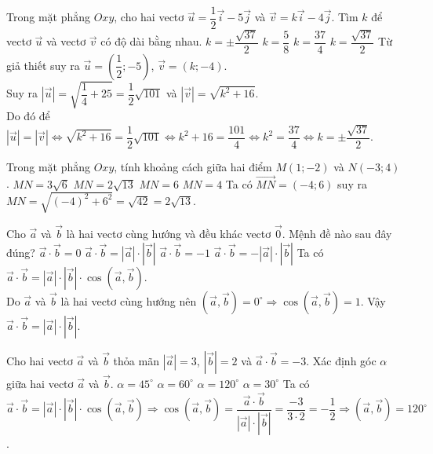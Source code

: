 \begin{ex}%
	Trong mặt phẳng $Oxy$, cho hai vectơ $\overrightarrow{u}=\dfrac{1}{2}\overrightarrow{i}-5\overrightarrow{j}$ và \break $\overrightarrow{v}=k\overrightarrow{i}-4\overrightarrow{j}$. Tìm $k$ để vectơ $\overrightarrow{u}$ và vectơ $\overrightarrow{v}$ có độ dài bằng nhau.
	\choice
	{\True $k=\pm \dfrac{\sqrt{37}}{2}$}
	{$k=\dfrac{5}{8}$}
	{$k=\dfrac{37}{4}$}
	{$k=\dfrac{\sqrt{37}}{2}$}
	\loigiai
	{Từ giả thiết suy ra $\overrightarrow{u}=(\dfrac{1}{2};-5 )$, $\overrightarrow{v}=(k;-4 )$.\\
		Suy ra $\left| \overrightarrow{u} \right|=\sqrt{\dfrac{1}{4}+25}=\dfrac{1}{2}\sqrt{101}$ và $\left| \overrightarrow{v} \right|=\sqrt{k^2+16}$. \\
		Do đó để
		$\left| \overrightarrow{u} \right|=\left| \overrightarrow{v} \right|\Leftrightarrow \sqrt{k^2+16}=\dfrac{1}{2}\sqrt{101}\Leftrightarrow k^2+16=\dfrac{101}{4}\Leftrightarrow k^2=\dfrac{37}{4}\Leftrightarrow k=\pm \dfrac{\sqrt{37}}{2}$. }
\end{ex}

\begin{ex}%
	Trong mặt phẳng $Oxy$, tính khoảng cách giữa hai điểm $M(1;-2 )$ và $N(-3;4 )$.
	\choice
	{$MN=3\sqrt{6}$}
	{\True $MN=2\sqrt{13}$}
	{$MN=6$}
	{$MN=4$}
	\loigiai
	{Ta có $\overrightarrow{MN}=(-4;6 )$ suy ra $MN=\sqrt{(-4 )^2+6^2}=\sqrt{42}=2\sqrt{13}$. }
\end{ex}


\begin{ex}%
	Cho $\vec{a}$ và $\vec{b}$ là hai vectơ cùng hướng và đều khác vectơ $\vec{0}$. Mệnh đề nào sau đây đúng?
	\choice
	{$\vec{a}\cdot\vec{b}=0$}
	{\True $\vec{a}\cdot\vec{b}=\left| \vec{a} \right|\cdot \left| \vec{b} \right|$}
	{$\vec{a}\cdot\vec{b}=-1$}
	{$\vec{a}\cdot\vec{b}=-\left| \vec{a} \right|\cdot\left| \vec{b} \right|$}
	\loigiai
	{Ta có $\vec{a}\cdot\vec{b}=\left| \vec{a} \right|\cdot\left| \vec{b} \right|\cdot\cos(\vec{a},\vec{b} )$.\\
		Do $\vec{a}$ và $\vec{b}$ là hai vectơ cùng hướng nên $(\vec{a},\vec{b} )=0^\circ\Rightarrow\cos(\vec{a},\vec{b} )=1$.
		Vậy $\vec{a}\cdot\vec{b}=\left| \vec{a} \right|\cdot\left| \vec{b} \right|$.}
\end{ex}

\begin{ex}%
	Cho hai vectơ $\vec{a}$ và $\vec{b}$ thỏa mãn $\left| \vec{a} \right|=3$, $\left| \vec{b} \right|=2$ và $\vec{a}\cdot\vec{b}=-3$. Xác định góc $\alpha $ giữa hai vectơ $\vec{a}$ và $\vec{b}$.
	\choice
	{$\alpha =45^\circ$}
	{$\alpha =60^\circ$}
	{\True $\alpha =120^\circ$}
	{$\alpha =30^\circ$}
	\loigiai
	{Ta có $\vec{a}\cdot\vec{b}=\left| \vec{a} \right|\cdot \left| \vec{b} \right|\cdot \cos(\vec{a},\vec{b} )\Rightarrow\cos(\vec{a},\vec{b} )=\dfrac{\vec{a}\cdot\vec{b}}{\left| {\vec{a}} \right|\cdot\left| \vec{b} \right|}=\dfrac{-3}{3\cdot2}=-\dfrac{1}{2}\Rightarrow(\vec{a},\vec{b} )=120^\circ$.}
\end{ex}

